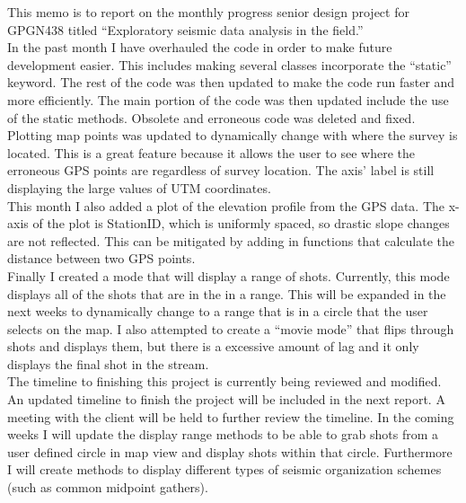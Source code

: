 \documentclass[a4paper,12pt]{texMemo}
\begin{document}
\maketitle

This memo is to report on the monthly progress senior design project for GPGN438 titled ``Exploratory seismic data analysis in the field.'' \\

In the past month I have overhauled the code in order to make future development easier. This includes making several classes incorporate the ``static'' keyword. The rest of the code was then updated to make the code run faster and more efficiently. The main portion of the code was then updated include the use of the static methods. Obsolete and erroneous code was deleted and fixed. \\

Plotting map points was updated to dynamically change with where the survey is located. This is a great feature because it allows the user to see where the erroneous GPS points are regardless of survey location. The axis' label is still displaying the large values of UTM coordinates. \\

This month I also added a plot of the elevation profile from the GPS data. The x-axis of the plot is StationID, which is uniformly spaced, so drastic slope changes are not reflected. This can be mitigated by adding in functions that calculate the distance between two GPS points. \\

Finally I created a mode that will display a range of shots. Currently, this mode displays all of the shots that are in the in a range. This will be expanded in the next weeks to dynamically change to a range that is in a circle that the user selects on the map. I also attempted to create a ``movie mode'' that flips through shots and displays them, but there is a excessive amount of lag and it only displays the final shot in the stream.\\

The timeline to finishing this project is currently being reviewed and modified. An updated timeline to finish the project will be included in the next report. A meeting with the client will be held to further review the timeline. In the coming weeks I will update the display range methods to be able to grab shots from a user defined circle in map view and display shots within that circle. Furthermore I will create methods to display different types of seismic organization schemes (such as common midpoint gathers).
\end{document}
